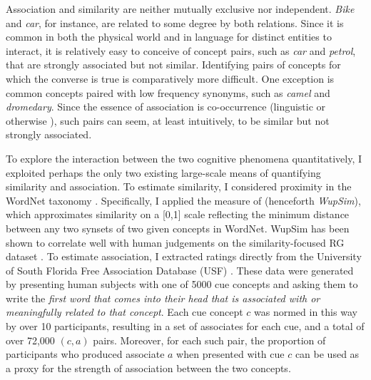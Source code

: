 Association and similarity are neither mutually exclusive nor independent. \emph{Bike} and \emph{car}, for instance, are related to some degree by both relations. Since it is common in both the physical world and in language for distinct entities to interact, it is relatively easy to conceive of concept pairs, such as \emph{car} and \emph{petrol}, that are strongly associated but not similar. Identifying pairs of concepts for which the converse is true is comparatively more difficult. One exception is common concepts paired with low frequency synonyms, such as \emph{camel} and \emph{dromedary}. Since the essence of association is co-occurrence (linguistic or otherwise \cite{mcrae2012semantic}), such pairs can seem, at least intuitively, to be similar but not strongly associated.  

To explore the interaction between the two cognitive phenomena quantitatively, I exploited perhaps the only two existing large-scale means of quantifying similarity and association. To estimate similarity, I considered proximity in the WordNet taxonomy \cite{fellbaum1999wordnet}. Specifically, I applied the measure of \cite{wu1994verbs} (henceforth \emph{WupSim}), which approximates similarity on a [0,1] scale reflecting the minimum distance between any two synsets of two given concepts in WordNet. WupSim has been shown to correlate well with human judgements on the similarity-focused RG dataset \cite{wu1994verbs}. To estimate association, I extracted ratings directly from the University of South Florida Free Association Database (USF) \cite{nelson2004university}. These data were generated by presenting human subjects with one of 5000 cue concepts and asking them to write the \emph{first word that comes into their head that is associated with or meaningfully related to that concept}. Each cue concept \( c \) was normed in this way by over 10 participants, resulting in a set of associates for each cue, and a total of over 72,000 \((c,a)\) pairs. Moreover, for each such pair, the proportion of participants who produced associate \(a\) when presented with cue \(c\) can be used as a proxy for the strength of association between the two concepts.

